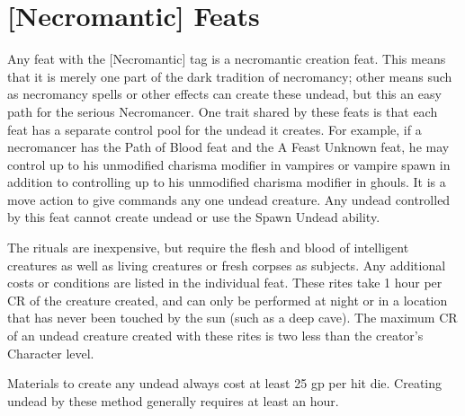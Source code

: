 
\section{[Necromantic] Feats} \label{feats:necromantic}


Any feat with the [Necromantic] tag is a necromantic creation feat. This means that it is merely one part of the dark tradition of necromancy; other means such as necromancy spells or other effects can create these undead, but this an easy path for the serious Necromancer. One trait shared by these feats is that each feat has a separate control pool for the undead it creates. For example, if a necromancer has the Path of Blood feat and the A Feast Unknown feat, he may control up to his unmodified charisma modifier in vampires or vampire spawn in addition to controlling up to his unmodified charisma modifier in ghouls. It is a move action to give commands any one undead creature. Any undead controlled by this feat cannot create undead or use the Spawn Undead ability.

The rituals are inexpensive, but require the flesh and blood of intelligent creatures as well as living creatures or fresh corpses as subjects. Any additional costs or conditions are listed in the individual feat. These rites take 1 hour per CR of the creature created, and can only be performed at night or in a location that has never been touched by the sun (such as a deep cave). The maximum CR of an undead creature created with these rites is two less than the creator's Character level.

Materials to create any undead always cost at least 25 gp per hit die. Creating undead by these method generally requires at least an hour.\\



